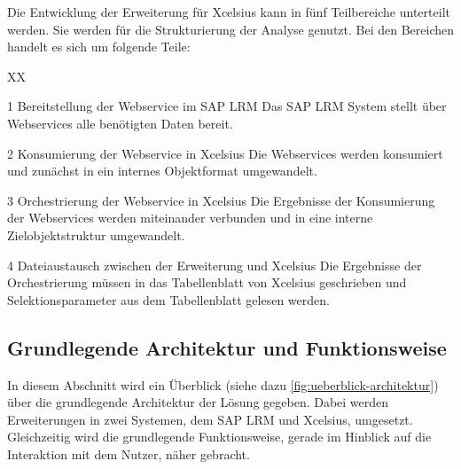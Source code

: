 \begin{onehalfspacing}
Die Entwicklung der Erweiterung für Xcelsius kann in fünf Teilbereiche unterteilt werden. Sie werden für die Strukturierung der Analyse genutzt. Bei den Bereichen handelt es sich um folgende Teile:


\begin{seToplist} { XX }
\item[1] Bereitstellung der Webservice im SAP LRM \newline
Das SAP LRM System stellt über Webservices alle benötigten Daten bereit.

\item[2] Konsumierung der Webservice in Xcelsius \newline
Die Webservices werden konsumiert und zunächst in ein internes Objektformat umgewandelt.

\item[3] Orchestrierung der Webservice in Xcelsius \newline
Die Ergebnisse der Konsumierung der Webservices werden miteinander verbunden und in eine interne Zielobjektstruktur umgewandelt.

\item[4] Dateiaustausch zwischen der Erweiterung und Xcelsius \newline
Die Ergebnisse der Orchestrierung müssen in das Tabellenblatt von Xcelsius geschrieben und Selektionsparameter aus dem Tabellenblatt gelesen werden.

\end{seToplist}

\subsection{Grundlegende Architektur und Funktionsweise}
In diesem Abschnitt wird ein Überblick (siehe dazu \vref{fig:ueberblick-architektur}) über die grundlegende Architektur der Lösung gegeben. Dabei werden Erweiterungen in zwei Systemen, dem SAP LRM und Xcelsius, umgesetzt. Gleichzeitig wird die grundlegende Funktionsweise, gerade im Hinblick auf die Interaktion mit dem Nutzer, näher gebracht.


\end{onehalfspacing}

